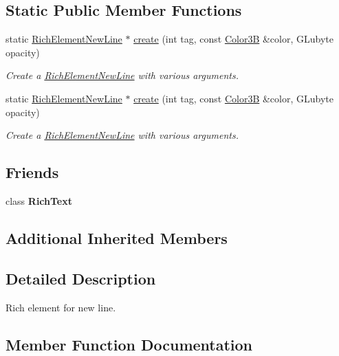 \subsection*{Static Public Member Functions}
\begin{DoxyCompactItemize}
\item 
static \hyperlink{classui_1_1RichElementNewLine}{Rich\+Element\+New\+Line} $\ast$ \hyperlink{classui_1_1RichElementNewLine_a4f349e03932d3c1699c8e740474384fe}{create} (int tag, const \hyperlink{structColor3B}{Color3B} \&color, G\+Lubyte opacity)
\begin{DoxyCompactList}\small\item\em Create a \hyperlink{classui_1_1RichElementNewLine}{Rich\+Element\+New\+Line} with various arguments. \end{DoxyCompactList}\item 
static \hyperlink{classui_1_1RichElementNewLine}{Rich\+Element\+New\+Line} $\ast$ \hyperlink{classui_1_1RichElementNewLine_a0477fd2b50ee1506920e83ee133d9b8e}{create} (int tag, const \hyperlink{structColor3B}{Color3B} \&color, G\+Lubyte opacity)
\begin{DoxyCompactList}\small\item\em Create a \hyperlink{classui_1_1RichElementNewLine}{Rich\+Element\+New\+Line} with various arguments. \end{DoxyCompactList}\end{DoxyCompactItemize}
\subsection*{Friends}
\begin{DoxyCompactItemize}
\item 
\mbox{\label{classui_1_1RichElementNewLine_a0e450ad30cc76fbbd86270e035cc8790}} 
class {\bfseries Rich\+Text}
\end{DoxyCompactItemize}
\subsection*{Additional Inherited Members}


\subsection{Detailed Description}
Rich element for new line. 

\subsection{Member Function Documentation}
\mbox{\label{classui_1_1RichElementNewLine_a4f349e03932d3c1699c8e740474384fe}} 
